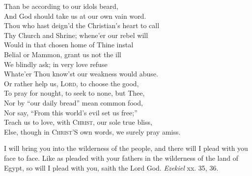  Than be according to our idols beard, \\
 And God should take us at our own vain word. \\
  Thou who hast deign’d the Christian’s heart to call \\
 Thy Church and Shrine; whene’er our rebel will \\
 Would in that chosen home of Thine instal \\
 Belial or Mammon, grant us not the ill \\
 We blindly ask; in very love refuse \\
 Whate’er Thou know’st our weakness would abuse. \\
  Or rather help us, \textsc{Lord}, to choose the good, \\
 To pray for nought, to seek to none, but Thee, \\
 Nor by “our daily bread” mean common food, \\
 Nor say, “From this world’s evil set us free;” \\
 Teach us to love, with \textsc{Christ}, our sole true bliss, \\
 Else, though in \textsc{Christ}’S own words, we surely pray amiss.\\


I will bring you into the wilderness of the people, and there will I plead with you face to face. Like as pleaded with your fathers in the wilderness of the land of Egypt, so will I plead with you, saith the Lord God. \emph{Ezekiel} xx. 35, 36.


